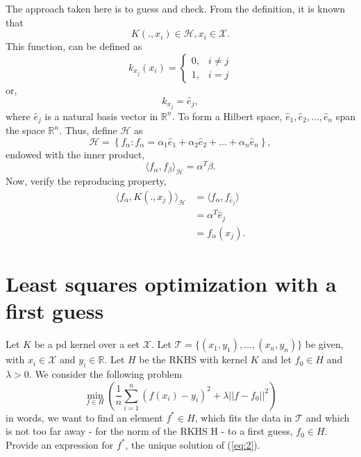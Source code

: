 \documentclass[12pt]{article}
\begin{document}
The approach taken here is to guess and check. From the definition, it is known that
\begin{equation}
K(., x_i) \in \mathcal H, x_i \in \mathcal X.
\end{equation}
This function, can be defined as
\begin{equation}
k_{x_j}(x_i)=\left\{\begin{array}{ll}{0,} & {i \neq j} \\ {1,} & {i=j}\end{array}\right.
\end{equation}
or,
\begin{equation}
k_{x_j} = \hat{e}_j,
\end{equation}
where $\hat{e}_j$ is a natural basis vector in $\mathbb R^n$. To form a Hilbert space, $\hat{e}_1,  \hat{e}_2,..., \hat{e}_n$ span the space $\mathbb R^n$. Thus, define $\mathcal H$ as
\begin{equation}
\mathcal H = \left\{ f_{\alpha} : f_{\alpha} = \alpha_1  \hat{e}_1 + \alpha_2  \hat{e}_2 + ... + \alpha_n  \hat{e}_n  \right\},
\end{equation}
endowed with the inner product,
\begin{equation}
\langle f_\alpha, f_\beta \rangle_{\mathcal H} = \alpha^T \beta.
\end{equation}
Now, verify the reproducing property,
\begin{equation}
\begin{aligned}
\langle f_\alpha, K(., x_j) \rangle_{\mathcal H}  &=\langle f_\alpha, f_{\hat{e}_j} \rangle \\
&= \alpha^T {\hat{e}_j} \\
&= f_\alpha (x_j).
\end{aligned}
\end{equation}


\newpage
\section{Least squares optimization with a first guess} 
Let $K$ be a pd kernel over a set $\mathcal{X}$. Let $\mathcal{T}=\{(x_1,y_1),\ldots,(x_n,y_n)\}$ be given, with $x_i \in \mathcal{X}$ and $y_i \in \mathbb{R}$. Let $H$ be the RKHS with kernel $K$ and let $f_0 \in H$ and $\lambda>0$. We consider the following problem 
\begin{equation}
\label{eq:2}
\min_{f \in H}\left( \frac{1}{n}\sum_{i=1}^n (f(x_i)-y_i)^2 + \lambda||f-f_0||^2\right)
\end{equation}
in words, we want to find an element $f^* \in H$, which fits the data in $\mathcal{T}$ and which is not too far away - for the norm of the RKHS H - to a first guess, $f_0 \in H$. 
Provide an expression for $f^*$, the unique solution of (\ref{eq:2}). 
\end{document}
